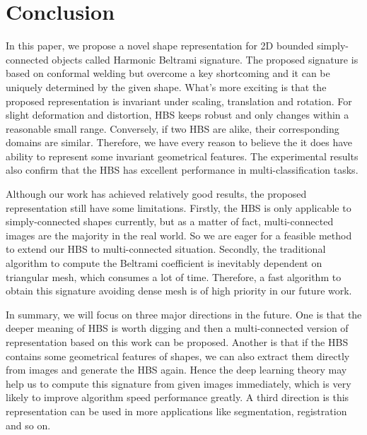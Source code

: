 \documentclass[review,onefignum,onetabnum]{siamonline190516}
\begin{document}
    \section{Conclusion}\label{conclusion}
        In this paper, we propose a novel shape representation for 2D bounded simply-connected objects called Harmonic Beltrami signature. The proposed signature is based on conformal welding but overcome a key shortcoming and it can be uniquely determined by the given shape. What's more exciting is that the proposed representation is invariant under scaling, translation and rotation. For slight deformation and distortion, HBS keeps robust and only changes within a reasonable small range. Conversely, if two HBS are alike, their corresponding domains are similar. Therefore, we have every reason to believe the it does have ability to represent some invariant geometrical features. The experimental results also confirm that the HBS has excellent performance in multi-classification tasks.

        Although our work has achieved relatively good results, the proposed representation still have some limitations. Firstly, the HBS is only applicable to simply-connected shapes currently, but as a matter of fact, multi-connected images are the majority in the real world. So we are eager for a feasible method to extend our HBS to multi-connected situation. Secondly, the traditional algorithm to compute the Beltrami coefficient is inevitably dependent on triangular mesh, which consumes a lot of time. Therefore, a fast algorithm to obtain this signature avoiding dense mesh is of high priority in our future work.

        In summary, we will focus on three major directions in the future. One is that the deeper meaning of HBS is worth digging and then a multi-connected version of representation based on this work can be proposed. Another is that if the HBS contains some geometrical features of shapes, we can also extract them directly from images and generate the HBS again. Hence the deep learning theory may help us to compute this signature from given images immediately, which is very likely to improve algorithm speed performance greatly. A third direction is this representation can be used in more applications like segmentation, registration and so on.
\end{document}
